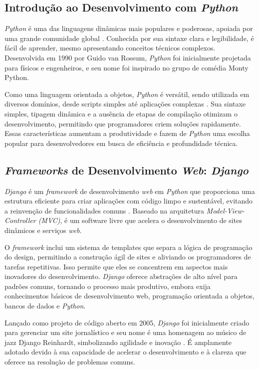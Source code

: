 \subsection{Introdução ao Desenvolvimento com \textit{Python}}
\textit{Python} é uma das linguagens dinâmicas mais populares e poderosas, apoiada por uma grande comunidade global \cite{borges2010}. Conhecida por sua sintaxe clara e legibilidade, é fácil de aprender, mesmo apresentando conceitos técnicos complexos. Desenvolvida em 1990 por Guido van Rossum, \textit{Python} foi inicialmente projetada para físicos e engenheiros, e seu nome foi inspirado no grupo de comédia Monty Python.

Como uma linguagem orientada a objetos, \textit{Python} é versátil, sendo utilizada em diversos domínios, desde scripts simples até aplicações complexas \cite{lutz2007}. Sua sintaxe simples, tipagem dinâmica e a ausência de etapas de compilação otimizam o desenvolvimento, permitindo que programadores criem soluções rapidamente. Essas características aumentam a produtividade e fazem de \textit{Python} uma escolha popular para desenvolvedores em busca de eficiência e profundidade técnica.

\subsection{\textit{Frameworks} de Desenvolvimento \textit{Web}: \textit{Django}}
\textit{Django} é um \textit{framework} de desenvolvimento \textit{web} em \textit{Python} que proporciona uma estrutura eficiente para criar aplicações com código limpo e sustentável, evitando a reinvenção de funcionalidades comuns \cite{meireles2010}. Baseado na arquitetura \textit{Model-View-Controller (MVC)}, é um software livre que acelera o desenvolvimento de sites dinâmicos e serviços \textit{web}.

O \textit{framework} inclui um sistema de templates que separa a lógica de programação do design, permitindo a construção ágil de sites e aliviando os programadores de tarefas repetitivas. Isso permite que eles se concentrem em aspectos mais inovadores do desenvolvimento. \textit{Django} oferece abstrações de alto nível para padrões comuns, tornando o processo mais produtivo, embora exija conhecimentos básicos de desenvolvimento web, programação orientada a objetos, bancos de dados e \textit{Python}.

Lançado como projeto de código aberto em 2005, \textit{Django} foi inicialmente criado para gerenciar um site jornalístico e seu nome é uma homenagem ao músico de jazz Django Reinhardt, simbolizando agilidade e inovação \cite{meireles2010}. É amplamente adotado devido à sua capacidade de acelerar o desenvolvimento e à clareza que oferece na resolução de problemas comuns.

